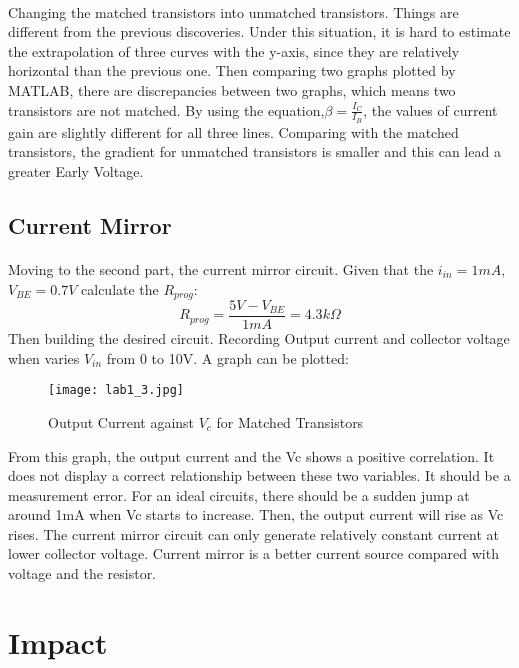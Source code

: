 \documentclass[12pt]{article}
\begin{document}
    \paragraph{}
    Changing the matched transistors into unmatched transistors. Things are different from the previous discoveries. Under this situation, it is hard to estimate the extrapolation of three curves with the y-axis, since they are relatively horizontal than the previous one. Then comparing two graphs plotted by MATLAB, there are discrepancies between two graphs, which means two transistors are not matched. By using the equation,$\beta = \frac{I_C}{I_B}$, the values of current gain are slightly different for all three lines. Comparing with the matched transistors, the gradient for unmatched transistors is smaller and this can lead a greater Early Voltage.
    
    \subsection{Current Mirror}
    \paragraph{}
    Moving to the second part, the current mirror circuit. Given that the $i_{in}=1 mA$,$V_{BE}=0.7V$ calculate the $R_{prog}$:
    \begin{equation}
        R_{prog}=\frac{5V-V_{BE}}{1mA}=4.3k\Omega
    \end{equation}
    Then building the desired circuit. Recording Output current and collector voltage when varies $V_{in}$ from 0 to 10V. A graph can be plotted:
    \begin{figure}[H]
    \centering
    \texttt{[image: lab1\_3.jpg]}
    \caption{Output Current against $V_c$ for Matched Transistors}
    \end{figure}
    From this graph, the output current and the Vc shows a positive correlation. It does not display a correct relationship between these two variables. It should be a measurement error. For an ideal circuits, there should be a sudden jump at around 1mA when Vc starts to increase. Then, the output current will rise as Vc rises. The current mirror circuit can only generate relatively constant current at lower collector voltage. Current mirror is a better current source compared with voltage and the resistor.
    
    
    
    \section{Impact}
\end{document}
